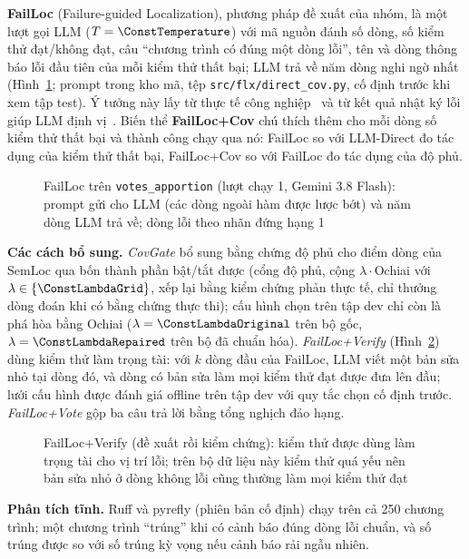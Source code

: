 \textbf{FailLoc} (Failure-guided Localization), phương pháp đề xuất của nhóm, là một lượt gọi LLM
($T = \ConstTemperature$) với mã nguồn đánh số dòng, số kiểm thử đạt/không đạt, câu ``chương trình có đúng một dòng
lỗi'', tên và dòng thông báo lỗi đầu tiên của mỗi kiểm thử thất bại; LLM trả về năm dòng nghi ngờ nhất
(Hình~\ref{fig:failloc-vd}; prompt trong kho mã, tệp \texttt{src/flx/direct\_cov.py}, cố định trước khi xem tập test).
Ý tưởng này lấy từ thực tế công nghiệp~\cite{medeiros2026crash} và từ kết quả nhật ký lỗi giúp LLM định vị~\cite{wu2023llmfl}. Biến thể \textbf{FailLoc+Cov} chú thích thêm cho mỗi dòng số kiểm thử thất bại và thành công
chạy qua nó: FailLoc so với LLM-Direct đo tác dụng của kiểm thử thất bại, FailLoc+Cov so với FailLoc đo tác dụng của độ phủ.

\begin{figure}[H]\centering

\caption{FailLoc trên \texttt{votes\_apportion} (lượt chạy 1, Gemini 3.8 Flash): prompt gửi cho LLM (các dòng ngoài hàm được lược bớt) và năm dòng LLM trả về; dòng lỗi theo nhãn đứng hạng 1}\label{fig:failloc-vd}
\end{figure}

\textbf{Các cách bổ sung.} \emph{CovGate} bổ sung bằng chứng độ phủ cho điểm dòng của SemLoc qua bốn thành phần bật/tắt
được (cổng độ phủ, cộng $\lambda\cdot$Ochiai với $\lambda \in \{\ConstLambdaGrid\}$, xếp lại bằng kiểm chứng phản thực
tế, chỉ thưởng dòng đoán khi có bằng chứng thực thi); cấu hình chọn trên tập dev chỉ còn là phá hòa bằng Ochiai
($\lambda = \ConstLambdaOriginal$ trên bộ gốc, $\lambda = \ConstLambdaRepaired$ trên bộ đã chuẩn hóa).
\emph{FailLoc+Verify} (Hình~\ref{fig:verify}) dùng kiểm thử làm trọng tài: với $k$ dòng đầu của FailLoc, LLM viết một bản
sửa nhỏ tại dòng đó, và dòng có bản sửa làm mọi kiểm thử đạt được đưa lên đầu; lưới \PavGridSize{} cấu hình được đánh
giá offline trên tập dev với quy tắc chọn cố định trước. \emph{FailLoc+Vote} gộp ba câu trả lời bằng tổng nghịch đảo hạng.

\begin{figure}[H]\centering

\caption{FailLoc+Verify (đề xuất rồi kiểm chứng): kiểm thử được dùng làm trọng tài cho vị trí lỗi; trên bộ dữ liệu này kiểm thử quá yếu nên bản sửa nhỏ ở dòng không lỗi cũng thường làm mọi kiểm thử đạt}\label{fig:verify}
\end{figure}

\textbf{Phân tích tĩnh.} Ruff và pyrefly (phiên bản cố định) chạy trên cả 250 chương trình; một chương trình ``trúng''
khi có cảnh báo đúng dòng lỗi chuẩn, và số trúng được so với số trúng kỳ vọng nếu cảnh báo rải ngẫu nhiên.

